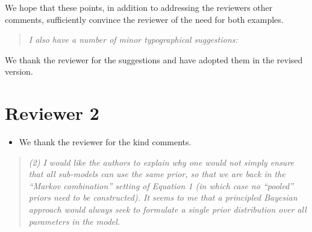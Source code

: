 \documentclass[
  10pt,
  a4paper,
]{article}
\providecommand{\tightlist}{%
  \setlength{\itemsep}{0pt}\setlength{\parskip}{0pt}}
\begin{document}
We hope that these points, in addition to addressing the reviewers other
comments, sufficiently convince the reviewer of the need for both
examples.

\begin{quote}
\emph{I also have a number of minor typographical suggestions:}
\end{quote}

We thank the reviewer for the suggestions and have adopted them in the
revised version.

\hypertarget{reviewer-2}{%
\section{Reviewer 2}\label{reviewer-2}}

\begin{itemize}
\tightlist
\item
  We thank the reviewer for the kind comments.
\end{itemize}

\begin{quote}
\emph{(2) I would like the authors to explain why one would not simply
ensure that all sub-models can use the same prior, so that we are back
in the ``Markov combination'' setting of Equation 1 (in which case no
``pooled'' priors need to be constructed). It seems to me that a
principled Bayesian approach would always seek to formulate a single
prior distribution over all parameters in the model.}
\end{quote}
\end{document}
